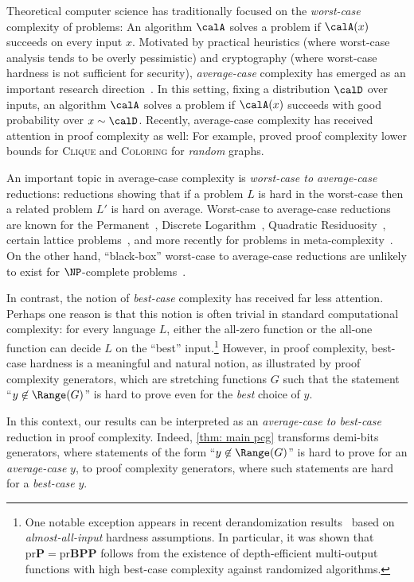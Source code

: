 Theoretical computer science has traditionally focused on the \emph{worst-case} complexity of problems: An algorithm $\calA$ solves a problem if $\calA(x)$ succeeds on every input $x$. Motivated by practical heuristics (where worst-case analysis tends to be overly pessimistic) and cryptography (where worst-case hardness is not sufficient for security), \emph{average-case} complexity has emerged as an important research direction~\cite{Impagliazzo95, BogdanovT06}. In this setting, fixing a distribution $\calD$ over inputs, an algorithm $\calA$ solves a problem if $\calA(x)$ succeeds with good probability over $x\sim \calD$. Recently, average-case complexity has received attention in proof complexity as well: For example, \cite{Pang21,DSPR23,CDSNPR23} proved proof complexity lower bounds for \textsc{Clique} and \textsc{Coloring} for \emph{random} graphs.

An important topic in average-case complexity is \emph{worst-case to average-case} reductions: reductions showing that if a problem $L$ is hard in the worst-case then a related problem $L'$ is hard on average. Worst-case to average-case reductions are known for the Permanent~\cite{CaiPS99}, Discrete Logarithm~\cite{BlumM84}, Quadratic Residuosity~\cite{GoldwasserM84}, certain lattice problems~\cite{Ajtai96}, and more recently for problems in meta-complexity~\cite{Hirahara18}. On the other hand, ``black-box'' worst-case to average-case reductions are unlikely to exist for $\NP$-complete problems~\cite{FeigenbaumF93, BogdanovT06-reduction}.

In contrast, the notion of \emph{best-case} complexity has received far less attention. Perhaps one reason is that this notion is often trivial in standard computational complexity: for every language $L$, either the all-zero function or the all-one function can decide $L$ on the ``best'' input.\footnote{One notable exception appears in recent derandomization results~\cite{CT21-FOCS} based on \emph{almost-all-input} hardness assumptions. In particular, it was shown that $\mathrm{pr}\mathbf{P} = \mathrm{pr}\mathbf{BPP}$ follows from the existence of depth-efficient multi-output functions with high best-case complexity against randomized algorithms.} However, in proof complexity, best-case hardness is a meaningful and natural notion, as illustrated by proof complexity generators, which are stretching functions $G$ such that the statement ``$y\not\in\Range(G)$'' is hard to prove even for the \emph{best} choice of $y$.

In this context, our results can be interpreted as an \emph{average-case to best-case} reduction in proof complexity. Indeed, \autoref{thm: main pcg} transforms demi-bits generators, where statements of the form ``$y\not\in\Range(G)$'' is hard to prove for an \emph{average-case} $y$, to proof complexity generators, where such statements are hard for a \emph{best-case} $y$.

